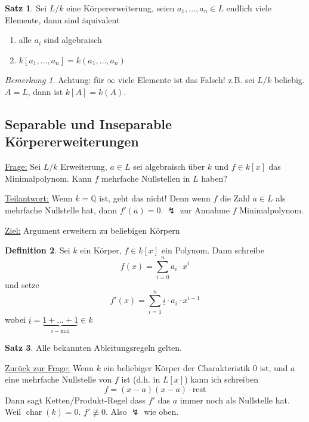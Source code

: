 \documentclass[12pt,parskip=full]{scrartcl}
\newcommand{\setQ}{\mathbb{Q}}
\newcommand{\heading}{\underline}
\theoremstyle{definition}
\newtheorem{theorem}{Satz}[section]
\newtheorem{definition}[theorem]{Definition}
\theoremstyle{remark}
\newtheorem*{remark}{Bemerkung}
\begin{document}
	\begin{theorem}
		Sei $L/k$ eine Körpererweiterung, seien $a_1, \dots, a_n \in L$ endlich viele Elemente, dann sind äquivalent
		\begin{enumerate}
			\item alle $a_i$ sind algebraisch
			\item $k[a_1, \dots, a_n] = k(a_1, \dots, a_n)$
		\end{enumerate}
	\end{theorem}

	\begin{remark}
		Achtung: für $\infty$ viele Elemente ist das Falsch! z.B. sei $L/k$ beliebig. $A = L$, dann ist $k[A] = k(A)$.
	\end{remark}

	\subsection{Separable und Inseparable Körpererweiterungen}
	
	\heading{Frage:} Sei $L/k$ Erweiterung, $a \in L$ sei algebraisch über $k$ und $f \in k[x]$ das Minimalpolynom. Kann $f$ mehrfache Nullstellen in $L$ haben?
	
	\heading{Teilantwort:} Wenn $k = \setQ$ ist, geht das nicht! Denn wenn $f$ die Zahl $a \in L$ als mehrfache Nullstelle hat, dann $f'(a) = 0$. $\lightning$ zur Annahme $f$ Minimalpolynom.
	
	\heading{Ziel:} Argument erweitern zu beliebigen Körpern
	
	\begin{definition}
		Sei $k$ ein Körper, $f \in k[x]$ ein Polynom. Dann schreibe
		\begin{equation*}
			f(x) = \sum_{i = 0}^n a_i \cdot x^i
		\end{equation*}
		und setze
		\begin{equation*}
			f'(x) = \sum_{i = 1}^n \underline{i} \cdot a_i \cdot x^{i-1}
		\end{equation*}
		wobei $\underline{i} = \underbrace{1 + \dots + 1}_{i-\text{mal}} \in k$
	\end{definition}

	\begin{theorem}
		Alle bekannten Ableitungsregeln gelten.
	\end{theorem}

	\heading{Zurück zur Frage:} Wenn $k$ ein beliebiger Körper der Charakteristik $0$ ist, und $a$ eine mehrfache Nullstelle von $f$ ist (d.h. in $L[x]$) kann ich schreiben
	\begin{equation*}
		f = (x-a)(x-a) \cdot \text{rest}
	\end{equation*}
	Dann sagt Ketten/Produkt-Regel dass $f'$ das $a$ immer noch als Nullstelle hat. Weil $\operatorname{char}(k) = 0$. $f' \not\equiv 0$. Also $\lightning$ wie oben.
	
\end{document}
